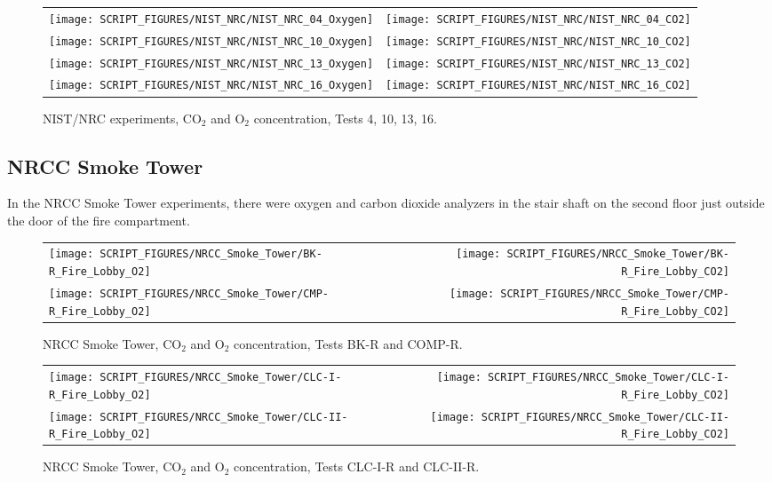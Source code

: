 \begin{figure}[p]
\begin{tabular*}{\textwidth}{l@{\extracolsep{\fill}}r}
\texttt{[image: SCRIPT\_FIGURES/NIST\_NRC/NIST\_NRC\_04\_Oxygen]} &
\texttt{[image: SCRIPT\_FIGURES/NIST\_NRC/NIST\_NRC\_04\_CO2]} \\
\texttt{[image: SCRIPT\_FIGURES/NIST\_NRC/NIST\_NRC\_10\_Oxygen]} &
\texttt{[image: SCRIPT\_FIGURES/NIST\_NRC/NIST\_NRC\_10\_CO2]} \\
\texttt{[image: SCRIPT\_FIGURES/NIST\_NRC/NIST\_NRC\_13\_Oxygen]} &
\texttt{[image: SCRIPT\_FIGURES/NIST\_NRC/NIST\_NRC\_13\_CO2]} \\
\texttt{[image: SCRIPT\_FIGURES/NIST\_NRC/NIST\_NRC\_16\_Oxygen]} &
\texttt{[image: SCRIPT\_FIGURES/NIST\_NRC/NIST\_NRC\_16\_CO2]}
\end{tabular*}
\caption{NIST/NRC experiments, CO$_2$ and O$_2$ concentration, Tests 4, 10, 13, 16.}
\label{NIST_NRC_Gas_Closed_2}
\end{figure}


\clearpage

\subsection{NRCC Smoke Tower}

In the NRCC Smoke Tower experiments, there were oxygen and carbon dioxide analyzers in the stair shaft on the second floor just outside the door of the fire compartment.

\begin{figure}[!ht]
\begin{tabular*}{\textwidth}{l@{\extracolsep{\fill}}r}
\texttt{[image: SCRIPT\_FIGURES/NRCC\_Smoke\_Tower/BK-R\_Fire\_Lobby\_O2]} &
\texttt{[image: SCRIPT\_FIGURES/NRCC\_Smoke\_Tower/BK-R\_Fire\_Lobby\_CO2]} \\
\texttt{[image: SCRIPT\_FIGURES/NRCC\_Smoke\_Tower/CMP-R\_Fire\_Lobby\_O2]} &
\texttt{[image: SCRIPT\_FIGURES/NRCC\_Smoke\_Tower/CMP-R\_Fire\_Lobby\_CO2]}
\end{tabular*}
\caption{NRCC Smoke Tower, CO$_2$ and O$_2$ concentration, Tests BK-R and COMP-R.}
\label{NRCC_Smoke_Tower_O2_CO2_1}
\end{figure}

\begin{figure}[!ht]
\begin{tabular*}{\textwidth}{l@{\extracolsep{\fill}}r}
\texttt{[image: SCRIPT\_FIGURES/NRCC\_Smoke\_Tower/CLC-I-R\_Fire\_Lobby\_O2]} &
\texttt{[image: SCRIPT\_FIGURES/NRCC\_Smoke\_Tower/CLC-I-R\_Fire\_Lobby\_CO2]} \\
\texttt{[image: SCRIPT\_FIGURES/NRCC\_Smoke\_Tower/CLC-II-R\_Fire\_Lobby\_O2]} &
\texttt{[image: SCRIPT\_FIGURES/NRCC\_Smoke\_Tower/CLC-II-R\_Fire\_Lobby\_CO2]}
\end{tabular*}
\caption{NRCC Smoke Tower, CO$_2$ and O$_2$ concentration, Tests CLC-I-R and CLC-II-R.}
\label{NRCC_Smoke_Tower_O2_CO2_2}
\end{figure}



